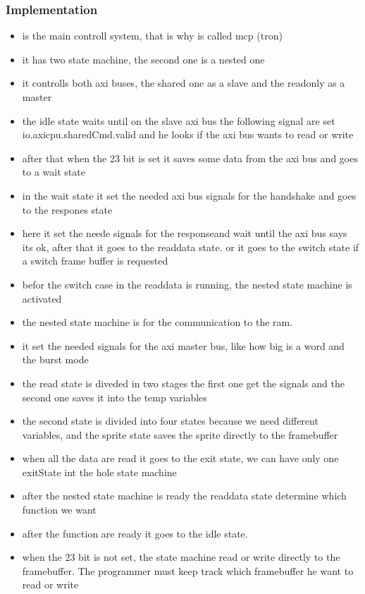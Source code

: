 \subsubsection*{Implementation}
\begin{itemize}
	\item is the main controll system, that is why is called mcp (tron)
	\item it has two state machine, the second one is a nested one
	\item it controlls both axi buses, the shared one as a slave and the readonly as a master
	\item the idle state waits until on the slave axi bus the following signal are set io.axicpu.sharedCmd.valid and he looks if the axi bus wants to read or write
	\item after that when the 23 bit is set it saves some data from the axi bus and goes to a wait state
	\item in the wait state it set the needed axi bus signals for the handshake and goes to the respones state
	\item here it set the neede signals for the responseand wait until the axi bus says its ok, after that it goes to the readdata state. or it goes to the switch state if a switch frame buffer is requested
	\item befor the switch case in the readdata is running, the nested state machine is activated
	\item the nested state machine is for the communication to the ram.
	\item it set the needed signals for the axi master bus, like how big is a word and the burst mode
	\item the read state is diveded in two stages the first one get the signals and the second one saves it into the temp variables
	\item the second state is divided into four states because we need different variables, and the sprite state saves the sprite directly to the framebuffer
	\item when all the data are read it goes to the exit state, we can have only one exitState int the hole state machine
	\item after the nested state machine is ready the readdata state determine which function we want
	\item after the function are ready it goes to the idle state.
	\item when the 23 bit is not set, the state machine read or write directly to the framebuffer. The programmer must keep track which framebuffer he want to read or write
\end{itemize}